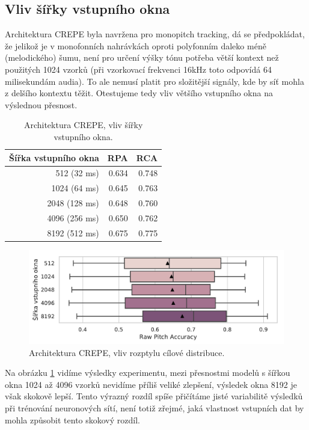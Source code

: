 \subsection{Vliv šířky vstupního okna}

Architektura CREPE byla navržena pro monopitch tracking, dá se předpokládat, že jelikož je v monofonních nahrávkách oproti polyfonním daleko méně (melodického) šumu, není pro určení výšky tónu potřeba větší kontext než použitých 1024 vzorků (při vzorkovací frekvenci 16kHz toto odpovídá 64 milisekundám audia). To ale nemusí platit pro složitější signály, kde by síť mohla z delšího kontextu těžit. Otestujeme tedy vliv většího vstupního okna na výslednou přesnost.


\begin{table}[h!]
\centering
    \begin{tabular}{rrr}
    \toprule
    Šířka vstupního okna &   RPA &   RCA \\
    \midrule
    512 (32 ms)   & 0.634 & 0.748 \\
    1024 (64 ms)  & 0.645 & 0.763 \\
    2048 (128 ms) & 0.648 & 0.760 \\
    4096 (256 ms) & 0.650 & 0.762 \\
    8192 (512 ms) & 0.675 & 0.775 \\
    \bottomrule
    \end{tabular}

\caption{Architektura CREPE, vliv šířky vstupního okna.}\label{tab:crepe_sirka}
\end{table}

\begin{figure}[h]\centering
    \includegraphics[scale=0.6]{../img/figures/crepe_sirka.pdf}
\caption{Architektura CREPE, vliv rozptylu cílové distribuce.}\label{obr:crepe_sirka}
\end{figure}

Na obrázku \ref{tab:crepe_sirka} vidíme výsledky experimentu, mezi přesnostmi modelů s šířkou okna 1024 až 4096 vzorků nevidíme příliš veliké zlepšení, výsledek okna 8192 je však skokově lepší. Tento výrazný rozdíl spíše přičítáme jisté variabilitě výsledků při trénování neuronových sítí, není totiž zřejmé, jaká vlastnost vstupních dat by mohla způsobit tento skokový rozdíl.

